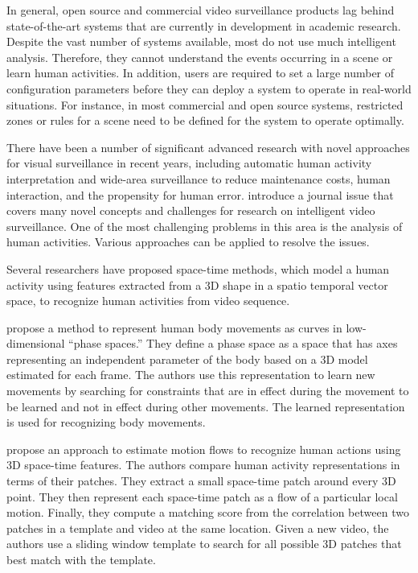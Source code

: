 In general, open source and commercial video surveillance products lag behind
state-of-the-art systems that are currently in development in academic
research.  Despite the vast number of systems available, most do not use much
intelligent analysis. Therefore, they cannot understand the events occurring in
a scene or learn human activities. In addition, users are required to set a
large number of configuration parameters before they can deploy a system to
operate in real-world situations.  For instance, in most commercial and open
source systems, restricted zones or rules for a scene need to be defined for
the system to operate optimally. 

There have been a number of significant advanced research with novel approaches
for visual surveillance in recent years, including automatic human activity
interpretation and wide-area surveillance to reduce maintenance costs, human
interaction, and the propensity for human error.
 introduce a journal issue that covers many
novel concepts and challenges for research on intelligent video surveillance.
One of the most challenging problems in this area is the analysis of human
activities. Various approaches can be applied to resolve the issues.  

Several researchers have proposed space-time methods, which model a human
activity using features extracted from a 3D shape in a spatio temporal vector
space, to recognize human activities from video sequence.

 propose a method to represent human body
movements as curves in low-dimensional ``phase spaces.'' They define a phase
space as a space that has axes representing an independent parameter of the
body based on a 3D model estimated for each frame.  The authors use this
representation to learn new movements by searching for constraints that are in
effect during the movement to be learned and not in effect during other
movements. The learned representation is used for recognizing body movements.

 propose an approach to estimate motion
flows to recognize human actions using 3D space-time features. The authors
compare human activity representations in terms of their patches. They extract
a small space-time patch around every 3D point. They then represent each
space-time patch as a flow of a particular local motion. Finally, they compute
a matching score from the correlation between two patches in a template and
video at the same location.  Given a new video, the authors use a sliding
window template to search for all possible 3D patches that best match with the
template.

